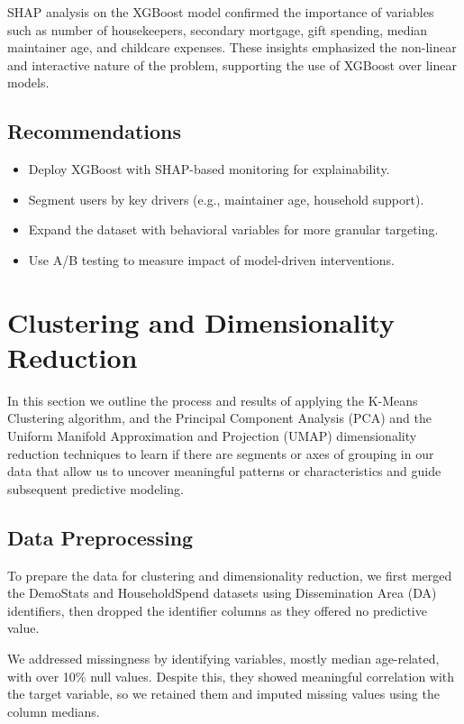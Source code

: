 \documentclass{article}
\begin{document}
SHAP analysis on the XGBoost model confirmed the importance of variables such as number of housekeepers, secondary mortgage, gift spending, median maintainer age, and childcare expenses. These insights emphasized the non-linear and interactive nature of the problem, supporting the use of XGBoost over linear models.

\subsection*{Recommendations}
\begin{itemize}
    \item Deploy XGBoost with SHAP-based monitoring for explainability.
    \item Segment users by key drivers (e.g., maintainer age, household support).
    \item Expand the dataset with behavioral variables for more granular targeting.
    \item Use A/B testing to measure impact of model-driven interventions.
\end{itemize}

\section{Clustering and Dimensionality Reduction}
In this section we outline the process and results of applying the K-Means Clustering algorithm, and the Principal Component Analysis (PCA) and the Uniform Manifold Approximation and Projection (UMAP) dimensionality reduction techniques to learn if there are segments or axes of grouping in our data that allow us to uncover meaningful patterns or characteristics and guide subsequent predictive modeling.

\subsection{Data Preprocessing}

To prepare the data for clustering and dimensionality reduction, we first merged the DemoStats and HouseholdSpend datasets using Dissemination Area (DA) identifiers, then dropped the identifier columns as they offered no predictive value.

We addressed missingness by identifying variables, mostly median age-related, with over 10\% null values. Despite this, they showed meaningful correlation with the target variable, so we retained them and imputed missing values using the column medians.
\end{document}
